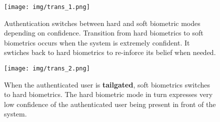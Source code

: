 \documentclass[12pt]{article}			%
\begin{document}

\begin{figure}[h]
	\centering
	\texttt{[image: img/trans\_1.png]}
	\caption{ \small Authentication switches between hard and soft biometric modes depending on confidence. Transition from hard biometrics to soft biometrics occurs when the system is extremely confident. It swtiches back to hard biometrics to re-inforce its belief when needed.}
	\label{fig:ca1}
\end{figure}

\begin{figure}
	\centering
	\texttt{[image: img/trans\_2.png]}
	\caption{\small When the authenticated user is {\bf tailgated}, soft biometrics switches to hard biometrics. The hard biometric mode in turn expresses very low confidence of the authenticated user being present in front of the system.}
	\label{fig:sb2}
\end{figure}
\end{document}
